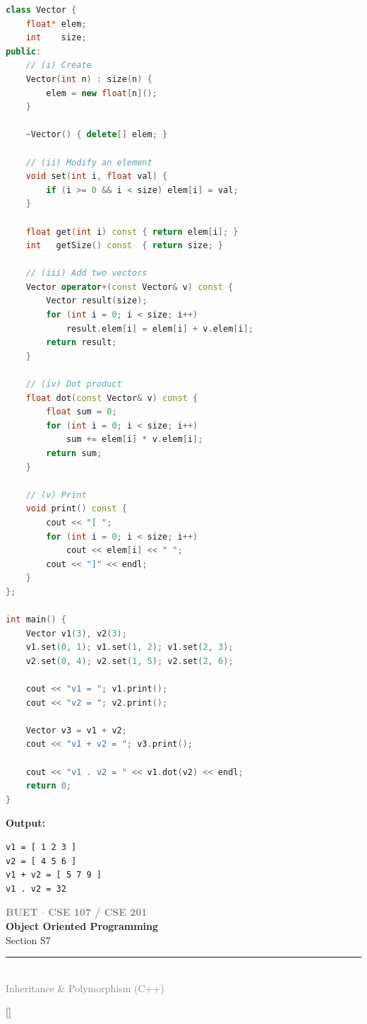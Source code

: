 \documentclass[12pt,a3paper]{article}
\newcommand{\secdivider}[4]{%
  \newpage\thispagestyle{empty}%
  \vspace*{\fill}%
  \begin{tcolorbox}[enhanced,colback=#4!7,colframe=#3,boxrule=1.5pt,arc=8pt,
    left=20pt,right=20pt,top=22pt,bottom=22pt,
    shadow={3pt}{-3pt}{0pt}{black!15}]
    \centering
    {\large\textcolor{gray}{\textbf{BUET $\cdot$ CSE 107 / CSE 201}}}\\[8pt]
    {\fontsize{26}{32}\selectfont\bfseries\textcolor{#3}{Object Oriented Programming}}\\[6pt]
    {\fontsize{15}{19}\selectfont\textcolor{dgray}{#1}}\\[12pt]
    \textcolor{#3!60}{\rule{0.5\textwidth}{0.5pt}}\\[6pt]
    {\small\textcolor{gray}{#2}}
  \end{tcolorbox}%
  \vspace*{\fill}\newpage%
}
\begin{document}
\begin{enumerate}
\begin{tcolorbox}[enhanced,breakable,ansbox,
  colback=cF!4,colframe=cF,boxrule=0.8pt,arc=5pt,
  title={\textbf{Answer --- Vector Class with Arithmetic Operations}},
  fonttitle=\bfseries\color{white},colbacktitle=cF]
\begin{lstlisting}[language=C++]
class Vector {
    float* elem;
    int    size;
public:
    // (i) Create
    Vector(int n) : size(n) {
        elem = new float[n]();
    }

    ~Vector() { delete[] elem; }

    // (ii) Modify an element
    void set(int i, float val) {
        if (i >= 0 && i < size) elem[i] = val;
    }

    float get(int i) const { return elem[i]; }
    int   getSize() const  { return size; }

    // (iii) Add two vectors
    Vector operator+(const Vector& v) const {
        Vector result(size);
        for (int i = 0; i < size; i++)
            result.elem[i] = elem[i] + v.elem[i];
        return result;
    }

    // (iv) Dot product
    float dot(const Vector& v) const {
        float sum = 0;
        for (int i = 0; i < size; i++)
            sum += elem[i] * v.elem[i];
        return sum;
    }

    // (v) Print
    void print() const {
        cout << "[ ";
        for (int i = 0; i < size; i++)
            cout << elem[i] << " ";
        cout << "]" << endl;
    }
};

int main() {
    Vector v1(3), v2(3);
    v1.set(0, 1); v1.set(1, 2); v1.set(2, 3);
    v2.set(0, 4); v2.set(1, 5); v2.set(2, 6);

    cout << "v1 = "; v1.print();
    cout << "v2 = "; v2.print();

    Vector v3 = v1 + v2;
    cout << "v1 + v2 = "; v3.print();

    cout << "v1 . v2 = " << v1.dot(v2) << endl;
    return 0;
}
\end{lstlisting}
\textbf{Output:}
\begin{verbatim}
v1 = [ 1 2 3 ]
v2 = [ 4 5 6 ]
v1 + v2 = [ 5 7 9 ]
v1 . v2 = 32
\end{verbatim}
\end{tcolorbox}


\end{enumerate}
\newpage

\secdivider{Section S7}{Inheritance \& Polymorphism (C++)}{cG}{cG}
\titleformat{\section}{\large\bfseries\color{cG}}{}{0em}{}[\titlerule]
\end{document}
